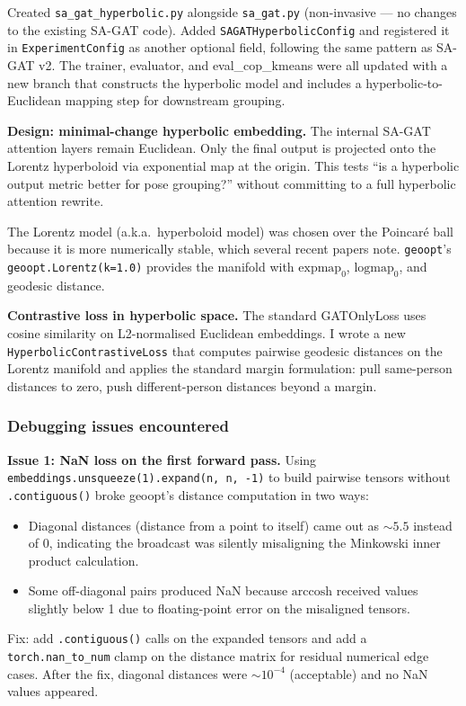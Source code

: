 Created \texttt{sa\_gat\_hyperbolic.py} alongside \texttt{sa\_gat.py} (non-invasive --- no changes to the existing SA-GAT code). Added \texttt{SAGATHyperbolicConfig} and registered it in \texttt{ExperimentConfig} as another optional field, following the same pattern as SA-GAT v2. The trainer, evaluator, and eval\_cop\_kmeans were all updated with a new branch that constructs the hyperbolic model and includes a hyperbolic-to-Euclidean mapping step for downstream grouping.

\textbf{Design: minimal-change hyperbolic embedding.} The internal SA-GAT attention layers remain Euclidean. Only the final output is projected onto the Lorentz hyperboloid via exponential map at the origin. This tests ``is a hyperbolic output metric better for pose grouping?'' without committing to a full hyperbolic attention rewrite.

The Lorentz model (a.k.a.\ hyperboloid model) was chosen over the Poincar\'e ball because it is more numerically stable, which several recent papers note. \texttt{geoopt}'s \texttt{geoopt.Lorentz(k=1.0)} provides the manifold with $\text{expmap}_0$, $\text{logmap}_0$, and geodesic distance.

\textbf{Contrastive loss in hyperbolic space.} The standard GATOnlyLoss uses cosine similarity on L2-normalised Euclidean embeddings. I wrote a new \texttt{HyperbolicContrastiveLoss} that computes pairwise geodesic distances on the Lorentz manifold and applies the standard margin formulation: pull same-person distances to zero, push different-person distances beyond a margin.

\subsubsection{Debugging issues encountered}

\textbf{Issue 1: NaN loss on the first forward pass.} Using \texttt{embeddings.unsqueeze(1).expand(n, n, -1)} to build pairwise tensors without \texttt{.contiguous()} broke geoopt's distance computation in two ways:
\begin{itemize}
    \item Diagonal distances (distance from a point to itself) came out as $\sim 5.5$ instead of $0$, indicating the broadcast was silently misaligning the Minkowski inner product calculation.
    \item Some off-diagonal pairs produced NaN because $\text{arccosh}$ received values slightly below 1 due to floating-point error on the misaligned tensors.
\end{itemize}
Fix: add \texttt{.contiguous()} calls on the expanded tensors and add a \texttt{torch.nan\_to\_num} clamp on the distance matrix for residual numerical edge cases. After the fix, diagonal distances were $\sim 10^{-4}$ (acceptable) and no NaN values appeared.

